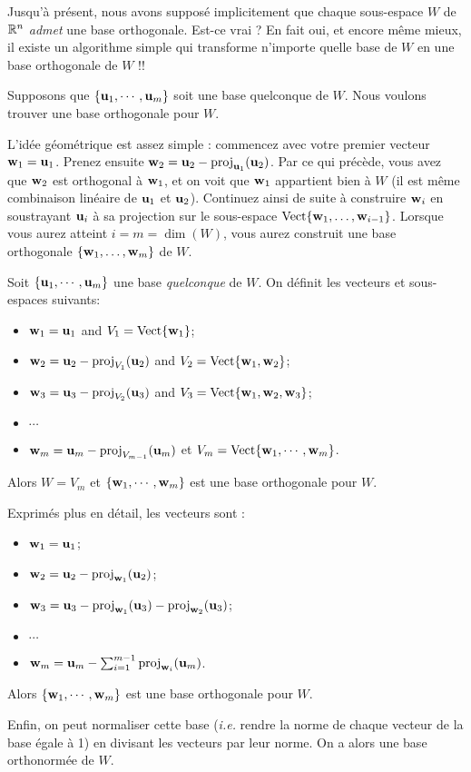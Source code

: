 Jusqu'à présent, nous avons supposé implicitement que chaque sous-espace $W$ de $\mathbb{R}^n$ {\it admet} une base orthogonale. Est-ce vrai ? En fait oui, et encore même mieux, il existe un algorithme simple qui transforme n'importe quelle base de $W$ en une base orthogonale de $W$ !\!!


 

Supposons que $\{\mathbf{u}_1, \cdots, \mathbf{u}_m \}$ soit une base quelconque de $W$.  Nous voulons trouver une base orthogonale pour $W$.

L'idée géométrique est assez simple : commencez avec votre premier vecteur $\mathbf{w}_1 = \mathbf{u}_1$.
Prenez ensuite $\mathbf{w}_2 = \mathbf{u}_2 - \operatorname{proj}_{\mathbf{u}_1}(\mathbf{u}_2)$. Par ce qui précède, vous avez que $\mathbf{w}_2$ est orthogonal à $\mathbf{w}_1$, et on voit que $\mathbf{w}_1$ appartient bien à $W$ (il est même combinaison linéaire de $\mathbf{u}_1$
et $\mathbf{u}_2$).  Continuez ainsi de suite à construire $\mathbf{w}_i$ en soustrayant $\mathbf{u}_i$ à sa projection sur le sous-espace $\textrm{Vect}\{\mathbf{w}_1, \dots, \mathbf{w}_{i-1}\}$. Lorsque vous aurez atteint $i=m=\dim(W)$, vous aurez construit une base orthogonale $\{\mathbf{w}_1, \dots, \mathbf{w}_{m}\}$ de $W$.

\begin{theorem}\label{theorem:GS}
Soit $\{\mathbf{u}_1, \cdots, \mathbf{u}_m \}$ une base {\it quelconque} de $W$.  On d\'efinit les vecteurs et sous-espaces suivants:
\begin{itemize}
\item $\mathbf{w}_1 = \mathbf{u}_1$  and $V_1 = \textrm{Vect}\{\mathbf{w}_1\}$;
\item $\mathbf{w}_2 = \mathbf{u}_2 - \operatorname{proj}_{V_1}(\mathbf{u}_2)$ and $V_2 = \textrm{Vect}\{\mathbf{w}_1,\mathbf{w}_2\}$;
\item $\mathbf{w}_3 = \mathbf{u}_3 - \operatorname{proj}_{V_2}(\mathbf{u}_3)$ and $V_3 = \textrm{Vect}\{\mathbf{w}_1,\mathbf{w}_2,\mathbf{w}_3\}$;
\item $\cdots$
\item $\mathbf{w}_m = \mathbf{u}_m - \operatorname{proj}_{V_{m-1}}(\mathbf{u}_m)$ et $V_m = \textrm{Vect}\{\mathbf{w}_1,\cdots,\mathbf{w}_m\}$.
\end{itemize}
Alors $W = V_m$ et   
$\{\mathbf{w}_1,\cdots,\mathbf{w}_m\}$ est une base orthogonale pour $W$.

\medskip
Exprimés plus en détail, les vecteurs sont :

\begin{itemize}
\item $\mathbf{w}_1 = \mathbf{u}_1$;
\item $\mathbf{w}_2 = \mathbf{u}_2 - \operatorname{proj}_{\mathbf{w}_1}(\mathbf{u}_2)$;
\item $\mathbf{w}_3 = \mathbf{u}_3 - \operatorname{proj}_{\mathbf{w}_1}(\mathbf{u}_3)-\operatorname{proj}_{\mathbf{w}_2}(\mathbf{u}_3)$;
\item $\cdots$
\item $\mathbf{w}_m = \mathbf{u}_m - \sum_{i=1}^{m-1}\operatorname{proj}_{\mathbf{w}_{i}}(\mathbf{u}_m)$.
\end{itemize}
Alors $\{\mathbf{w}_1,\cdots,\mathbf{w}_m\}$ est une base orthogonale pour $W$.

Enfin, on peut normaliser cette base (\textit{i.e.} rendre la norme de chaque vecteur de la base \'egale \`a 1) en divisant les vecteurs par leur norme. On a alors
une base orthonormée de $W$.
\end{theorem}

